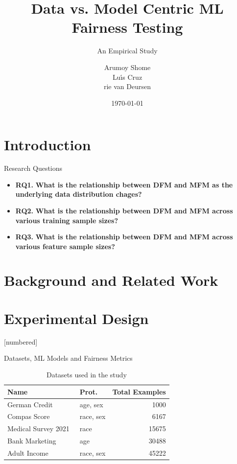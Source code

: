 \documentclass{beamer}
\title{Data vs. Model Centric ML Fairness Testing}
\subtitle{An Empirical Study}
\author{Arumoy Shome\texorpdfstring{\\}{,} Lu{\'\i}s
  Cruz\texorpdfstring{\\}Arie van Deursen}
\institute{Delft University of Technology}
\date{\today}
\begin{document}
\begin{frame}
  \maketitle
\end{frame}

\section{Introduction}
\begin{frame}{Research Questions}
  \begin{itemize}
  \item{\textbf{RQ1.}} \textbf{What is the relationship between DFM
    and MFM as the underlying data distribution chages?}
  \item{\textbf{RQ2.}} \textbf{What is the relationship between DFM and
    MFM across various training sample sizes?}
  \item{\textbf{RQ3.}} \textbf{What is the relationship between DFM and
    MFM across various feature sample sizes?}
  \end{itemize}
\end{frame}

\section{Background and Related Work}
\section{Experimental Design}
[numbered]
\begin{frame}[t]{Datasets, ML Models and Fairness Metrics}
  \begin{table}
    \centering
    \caption{Datasets used in the study}
    \begin{tabular}{llr}
      \toprule
      \textbf{Name} & \textbf{Prot.} & \textbf{Total Examples}\\
      \midrule
      German Credit \cite{CITEME} & age, sex & 1000\\
      Compas Score \cite{CITEME} & race, sex & 6167\\
      Medical Survey 2021 \cite{CITEME} & race & 15675\\
      Bank Marketing \cite{CITEME} & age & 30488\\
      Adult Income \cite{CITEME} & race, sex & 45222\\
      \bottomrule
    \end{tabular}
    \label{tab:datasets}
  \end{table}
\end{frame}
\end{document}
